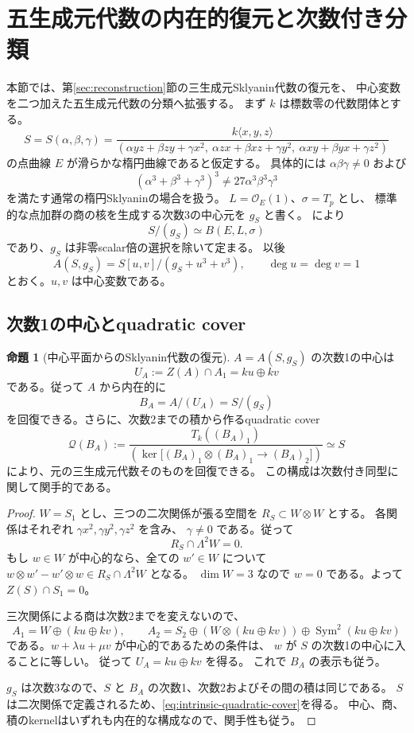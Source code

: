 \documentclass[a4paper,11pt]{ltjsarticle}
\theoremstyle{definition}
\newtheorem{theorem}{命題}[section]
\newcommand{\OO}{\mathcal O}
\newcommand{\Sym}{\operatorname{Sym}}
\begin{document}
\section{五生成元代数の内在的復元と次数付き分類}\label{sec:five-generator}

本節では、第\ref{sec:reconstruction}節の三生成元Sklyanin代数の復元を、
中心変数を二つ加えた五生成元代数の分類へ拡張する。
まず $k$ は標数零の代数閉体とする。
\[
 S=S(\alpha,\beta,\gamma)
 =\frac{k\langle x,y,z\rangle}
 {(\alpha yz+\beta zy+\gamma x^2,\
   \alpha zx+\beta xz+\gamma y^2,\
   \alpha xy+\beta yx+\gamma z^2)}
\]
の点曲線 $E$ が滑らかな楕円曲線であると仮定する。
具体的には $\alpha\beta\gamma\ne0$ および
\[
 (\alpha^3+\beta^3+\gamma^3)^3\ne27\alpha^3\beta^3\gamma^3
\]
を満たす通常の楕円Sklyaninの場合を扱う。
$L=\OO_E(1)$、$\sigma=T_p$ とし、
標準的な点加群の商の核を生成する次数3の中心元を $g_S$ と書く。
\cite[Definition--Lemma 2.13, Lemma 2.19]{WWY}により
\[
 S/(g_S)\simeq B(E,L,\sigma)
\]
であり、$g_S$ は非零scalar倍の選択を除いて定まる。
以後
\[
 A(S,g_S)=S[u,v]/(g_S+u^3+v^3),\qquad \deg u=\deg v=1
\]
とおく。$u,v$ は中心変数である。

\subsection{次数1の中心とquadratic cover}

\begin{theorem}[中心平面からのSklyanin代数の復元]\label{thm:intrinsic-sklyanin}
$A=A(S,g_S)$ の次数1の中心は
\[
 U_A:=Z(A)\cap A_1=ku\oplus kv
\]
である。従って $A$ から内在的に
\[
 B_A=A/(U_A)=S/(g_S)
\]
を回復できる。さらに、次数2までの積から作るquadratic cover
\begin{equation}\label{eq:intrinsic-quadratic-cover}
 \mathcal Q(B_A):=
 \frac{T_k((B_A)_1)}
 {\left(\ker\bigl[(B_A)_1\otimes(B_A)_1\longrightarrow(B_A)_2\bigr]\right)}
 \simeq S
\end{equation}
により、元の三生成元代数そのものを回復できる。
この構成は次数付き同型に関して関手的である。
\end{theorem}

\begin{proof}
$W=S_1$ とし、三つの二次関係が張る空間を $R_S\subset W\otimes W$ とする。
各関係はそれぞれ $\gamma x^2,\gamma y^2,\gamma z^2$ を含み、
$\gamma\ne0$ である。従って
\[
 R_S\cap\Lambda^2W=0.
\]
もし $w\in W$ が中心的なら、全ての $w'\in W$ について
$w\otimes w'-w'\otimes w\in R_S\cap\Lambda^2W$ となる。
$\dim W=3$ なので $w=0$ である。よって $Z(S)\cap S_1=0$。

三次関係による商は次数2までを変えないので、
\[
 A_1=W\oplus(ku\oplus kv),\qquad
 A_2=S_2\oplus(W\otimes(ku\oplus kv))\oplus\Sym^2(ku\oplus kv)
\]
である。$w+\lambda u+\mu v$ が中心的であるための条件は、
$w$ が $S$ の次数1の中心に入ることに等しい。
従って $U_A=ku\oplus kv$ を得る。
これで $B_A$ の表示も従う。

$g_S$ は次数3なので、$S$ と $B_A$ の次数1、次数2およびその間の積は同じである。
$S$ は二次関係で定義されるため、\eqref{eq:intrinsic-quadratic-cover}を得る。
中心、商、積のkernelはいずれも内在的な構成なので、関手性も従う。
\end{proof}
\end{document}
